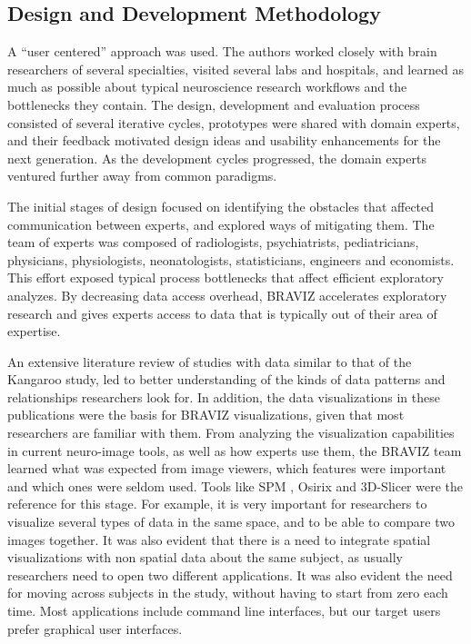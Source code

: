 \documentclass[utf8,paper]{frontiersSCNS} %
\begin{document}
\subsection{Design and Development Methodology}

A ``user centered'' approach\citep{fernandez_user-centered_2013,wassink_applying_2009} was used. The authors worked closely with brain researchers of several specialties, visited several labs and hospitals, and learned as much as possible about typical neuroscience research workflows and the bottlenecks they contain. The design, development and evaluation process consisted of several iterative cycles, prototypes were shared with domain experts, and their feedback motivated design ideas and usability enhancements for the next generation. As the development cycles progressed, the domain experts ventured further away from common paradigms.

The initial stages of design focused on identifying the obstacles that affected communication between experts, and explored ways of mitigating them. The team of experts was composed of radiologists, psychiatrists, pediatricians, physicians, physiologists, neonatologists,  statisticians, engineers and economists. This effort exposed typical process bottlenecks that affect efficient exploratory analyzes. By decreasing data access overhead, BRAVIZ accelerates exploratory research and gives experts access to data that is typically out of their area of expertise.

An extensive literature review of studies with data similar to that of the Kangaroo study, led to better understanding of the kinds of data patterns and relationships researchers look for. In addition, the data visualizations in these publications were the basis for BRAVIZ visualizations, given that most researchers are familiar with them. From analyzing the visualization capabilities in current neuro-image tools, as well as how experts use them, the BRAVIZ team learned what was expected from image viewers, which features were important and which ones were seldom used. Tools like SPM \citep{friston_statistical_2007}, Osirix \citep{rosset_osirix:_2004} and 3D-Slicer \citep{fedorov_3d_2012} were the reference for this stage. For example, it is very important for researchers to visualize several types of data in the same space, and to be able to compare two images together. It was also evident that there is a need to integrate spatial visualizations with non spatial data about the same subject, as usually researchers need to open two different applications. It was also evident the need for moving across subjects in the study, without having to start from zero each time. Most applications include command line interfaces, but our target users prefer graphical user interfaces. 
\end{document}
